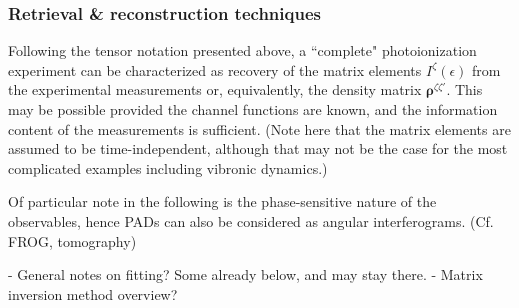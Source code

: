 \subsubsection{Retrieval \& reconstruction techniques}


Following the tensor notation presented above, a ``complete" photoionization experiment can be characterized as recovery of the matrix elements $I^{\zeta}(\epsilon)$ from the experimental measurements or, equivalently, the density matrix $\mathbf{\rho}^{\zeta\zeta'}$. This may be possible provided the channel functions are known, and the information content of the measurements is sufficient. (Note here that the matrix elements are assumed to be time-independent, although that may not be the case for the most complicated examples including vibronic dynamics.)

Of particular note in the following is the phase-sensitive nature of the observables, hence PADs can also be considered as angular interferograms. (Cf. FROG, tomography)

- General notes on fitting? Some already below, and may stay there.
- Matrix inversion method overview?